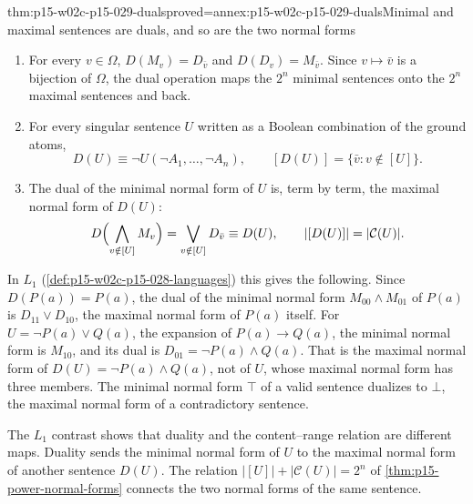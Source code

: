 \begin{hbtheorem}{thm:p15-w02c-p15-029-duals}{proved=annex:p15-w02c-p15-029-duals}{Minimal and maximal sentences are duals, and so are the two normal forms}
\begin{enumerate}
\item For every \(v\in\Omega\), \(D(M_v)=D_{\bar v}\) and
  \(D(D_v)=M_{\bar v}\). Since \(v\mapsto\bar v\) is a bijection of
  \(\Omega\), the dual operation maps the \(2^n\) minimal sentences
  onto the \(2^n\) maximal sentences and back.
\item For every singular sentence \(U\) written as a Boolean combination
  of the ground atoms,
  \[
   D(U)\equiv\neg U(\neg A_1,\ldots,\neg A_n),\qquad
   [D(U)]=\{\bar v:v\notin[U]\}.
  \]
\item The dual of the minimal normal form of \(U\) is, term by term, the
  maximal normal form of \(D(U)\):
  \[
   D\Bigl(\bigwedge_{v\notin[U]}M_v\Bigr)=\bigvee_{v\notin[U]}D_{\bar v}
   \equiv D(U),
   \qquad |[D(U)]|=|\mathcal C(U)|.
  \]
\end{enumerate}
In \(L_1\) (\cref{def:p15-w02c-p15-028-languages}) this gives the
following. Since \(D(P(a))=P(a)\), the dual of the minimal normal form
\(M_{00}\land M_{01}\) of \(P(a)\) is \(D_{11}\lor D_{10}\), the maximal
normal form of \(P(a)\) itself. For \(U=\neg P(a)\lor Q(a)\), the
expansion of \(P(a)\to Q(a)\), the minimal normal form is \(M_{10}\), and
its dual is \(D_{01}=\neg P(a)\land Q(a)\). That is the maximal normal
form of \(D(U)=\neg P(a)\land Q(a)\), not of \(U\), whose maximal normal
form has three members. The minimal normal form \(\top\) of a valid
sentence dualizes to \(\bot\), the maximal normal form of a contradictory
sentence.
\end{hbtheorem}

The \(L_1\) contrast shows that duality and the content--range
relation are different maps. Duality sends the minimal normal form of
\(U\) to the maximal normal form of another sentence \(D(U)\). The
relation \(|[U]|+|\mathcal C(U)|=2^n\) of
\cref{thm:p15-power-normal-forms} connects the two normal forms of the
same sentence.

